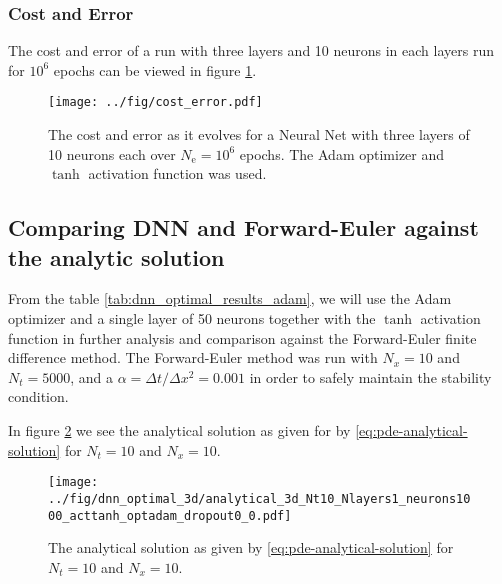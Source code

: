 \subsubsection{Cost and Error} 
The cost and error of a run with three layers and 10 neurons in each layers run for $10^6$ epochs can be viewed in figure \ref{fig:cost-error}.
\begin{figure}
    \centering
    \texttt{[image: ../fig/cost\_error.pdf]}
    \caption{The cost and error as it evolves for a Neural Net with three layers of 10 neurons each over $N_\mathrm{e}=10^6$ epochs. The Adam optimizer and $\tanh$ activation function was used.}
    \label{fig:cost-error}
\end{figure}



\subsection{Comparing DNN and Forward-Euler against the analytic solution}
From the table \ref{tab:dnn_optimal_results_adam}, we will use the Adam optimizer and a single layer of 50 neurons together with the $\tanh$ activation function in further analysis and comparison against the Forward-Euler finite difference method. The Forward-Euler method was run with $N_x=10$ and $N_t=5000$, and a $\alpha=\Delta t / \Delta x^2=0.001$ in order to safely maintain the stability condition.

In figure \ref{fig:analytical-solution} we see the analytical solution as given for by \eqref{eq:pde-analytical-solution} for $N_t=10$ and $N_x=10$.
\begin{figure}[h!tb]
    \centering
    \texttt{[image: ../fig/dnn\_optimal\_3d/analytical\_3d\_Nt10\_Nlayers1\_neurons1000\_acttanh\_optadam\_dropout0\_0.pdf]}
    \caption{The analytical solution as given by \eqref{eq:pde-analytical-solution} for $N_t=10$ and $N_x=10$.}
    \label{fig:analytical-solution}
\end{figure}

